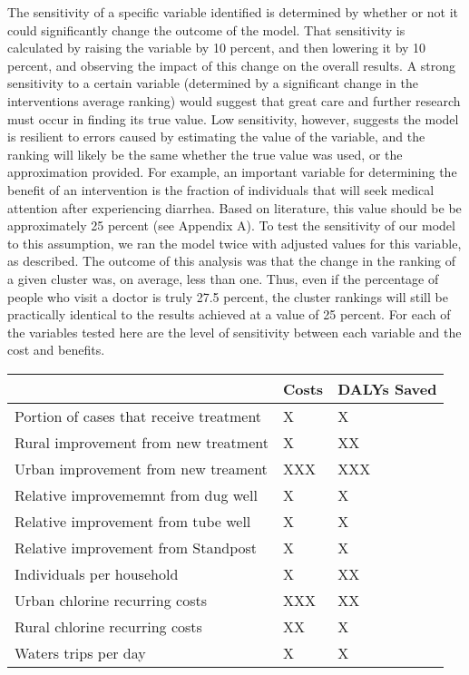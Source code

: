 The sensitivity of a specific variable identified is determined by whether or not it could significantly change the outcome of the model.
That sensitivity is calculated by raising the variable by 10 percent, and then lowering it by 10 percent, and observing the impact of this change on the overall results.
A strong sensitivity to a certain variable (determined by a significant change in the interventions average ranking) would suggest that great care and further research must occur in finding its true value.
Low sensitivity, however, suggests the model is resilient to errors caused by estimating the value of the variable, and the ranking will likely be the same whether the true value was used, or the approximation provided.
For example, an important variable for determining the benefit of an intervention is the fraction of individuals that will seek medical attention after experiencing diarrhea.
Based on literature, this value should be be approximately 25 percent (see Appendix A).
To test the sensitivity of our model to this assumption, we ran the model twice with adjusted values for this variable, as described.
The outcome of this analysis was that the change in the ranking of a given cluster was, on average, less than one.
Thus, even if the percentage of people who visit a doctor is truly 27.5 percent, the cluster rankings will still be practically identical to the results achieved at a value of 25 percent.
For each of the variables tested here are the level of sensitivity between each variable and the cost and benefits.

\begin{center}
\begin{tabular}{l|l|l}
\hline
& Costs & DALYs Saved \\ \hline
Portion of cases that receive treatment & X & X \\ \hline
Rural improvement from new treatment & X & XX \\ \hline
Urban improvement from new treament & XXX & XXX \\ \hline
Relative improvememnt from dug well & X & X \\ \hline
Relative improvement from tube well & X & X \\ \hline
Relative improvement from Standpost & X & X \\ \hline
Individuals per household & X & XX \\ \hline
Urban chlorine recurring costs & XXX & XX \\ \hline
Rural chlorine recurring costs & XX & X \\ \hline
Waters trips per day & X & X \\ \hline

\end{tabular}
\end{center}


